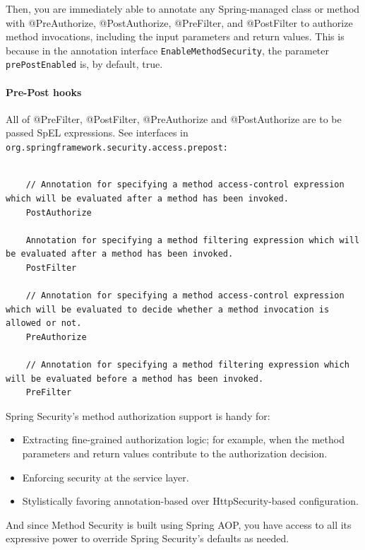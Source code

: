 \documentclass{scrartcl}
\begin{document}
Then, you are immediately able to annotate any Spring-managed class or method with @PreAuthorize, @PostAuthorize, @PreFilter, and @PostFilter to authorize method invocations, including the input parameters and return values. This is because in the annotation interface \lstinline|EnableMethodSecurity|, the parameter \lstinline|prePostEnabled| is, by default, true.

\paragraph{Pre-Post hooks}

All of @PreFilter, @PostFilter, @PreAuthorize and @PostAuthorize are to be passed SpEL expressions. See interfaces in \lstinline|org.springframework.security.access.prepost:|

\begin{lstlisting}

    // Annotation for specifying a method access-control expression which will be evaluated after a method has been invoked.
    PostAuthorize

    Annotation for specifying a method filtering expression which will be evaluated after a method has been invoked.
    PostFilter

    // Annotation for specifying a method access-control expression which will be evaluated to decide whether a method invocation is allowed or not.
    PreAuthorize

    // Annotation for specifying a method filtering expression which will be evaluated before a method has been invoked.
    PreFilter

\end{lstlisting}

Spring Security’s method authorization support is handy for:

\begin{itemize}
    \item Extracting fine-grained authorization logic; for example, when the method parameters and return values contribute to the authorization decision.
    \item Enforcing security at the service layer.
    \item Stylistically favoring annotation-based over HttpSecurity-based configuration.
\end{itemize}

And since Method Security is built using Spring AOP, you have access to all its expressive power to override Spring Security’s defaults as needed.
\end{document}
